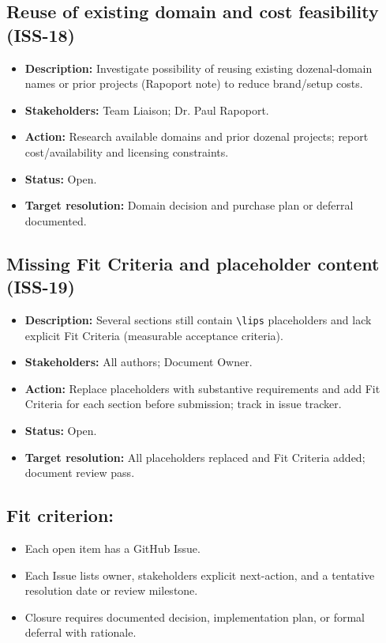 \documentclass[12pt]{article}
\newcommand{\lips}{\textit{Insert your content here.}}
\begin{document}
\subsection{Reuse of existing domain and cost feasibility (ISS-18)}
\begin{itemize}
  \item \textbf{Description:} Investigate possibility of reusing existing dozenal-domain names or prior projects (Rapoport note) to reduce brand/setup costs.
  \item \textbf{Stakeholders:} Team Liaison; Dr. Paul Rapoport.
  \item \textbf{Action:} Research available domains and prior dozenal projects; report cost/availability and licensing constraints.
  \item \textbf{Status:} Open.
  \item \textbf{Target resolution:} Domain decision and purchase plan or deferral documented.
\end{itemize}

\subsection{Missing Fit Criteria and placeholder content (ISS-19)}
\begin{itemize}
  \item \textbf{Description:} Several sections still contain \verb|\lips| placeholders and lack explicit Fit Criteria (measurable acceptance criteria).
  \item \textbf{Stakeholders:} All authors; Document Owner.
  \item \textbf{Action:} Replace placeholders with substantive requirements and add Fit Criteria for each section before submission; track in issue tracker.
  \item \textbf{Status:} Open.
  \item \textbf{Target resolution:} All placeholders replaced and Fit Criteria added; document review pass.
\end{itemize}
  
\subsection{Fit criterion:}
  \begin{itemize}
    \item Each open item has a GitHub Issue.
    \item Each Issue lists owner, stakeholders explicit next-action, and a tentative resolution date or review milestone.
    \item Closure requires documented decision, implementation plan, or formal deferral with rationale.
  \end{itemize}
\end{document}
